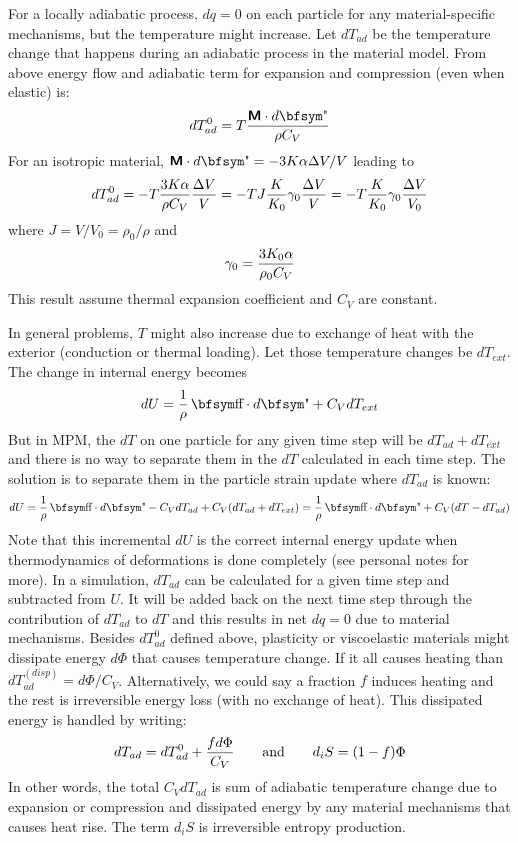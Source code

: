 \documentclass[11pt]{book}
\newcommand{\tens}[1]{\boldsymbol{\mathsf{#1}}}
\def\st{{\hbox{\bfsym\char'033}}}
\def\et{{\hbox{\bfsym\char'042}}}
\begin{document}
For a locally adiabatic process, $dq=0$ on each particle for any material-specific mechanisms, but the temperature might increase. Let $dT_{ad}$ be the temperature change that happens during an adiabatic process in the material model. From above energy flow and adiabatic term for expansion and compression (even when elastic) is:
\begin{equation}
    dT_{ad}^0 = T {\tens{M}\cdot d\et\over \rho C_V}
\end{equation}
For an isotropic material, $\tens{M}\cdot d\et = - 3K\alpha \Delta V/V$ leading to
\begin{equation}
    dT_{ad}^0 = -T {3K\alpha\over \rho C_V}{\Delta V\over V} = -T J {K\over K_0} \gamma_0 {\Delta V\over V} = -T {K\over K_0} \gamma_0 {\Delta V\over V_0}
\end{equation}
where $J = V/V_0 = \rho_0/ \rho$ and
\begin{equation}
    \gamma_0 = {3K_0\alpha\over \rho_0 C_V}      \label{gamzdef}
\end{equation}
This result assume thermal expansion coefficient and $C_V$ are constant.

In general problems, $T$ might also increase due to exchange of heat with the exterior (conduction or thermal loading). Let those temperature changes be $dT_{ext}$. The change in internal energy becomes
\begin{equation}
    dU = {1\over \rho}\thinspace \st\cdot d\et + C_V dT_{ext}
\end{equation}
But in MPM, the $dT$ on one particle for any given time step will be $dT_{ad}+dT_{ext}$ and there is no way to separate them in the $dT$ calculated in each time step. The solution is to separate them in the particle strain update where $dT_{ad}$ is known:
\begin{equation}
    dU = {1\over \rho}\thinspace \st\cdot d\et - C_V dT_{ad} + C_V (dT_{ad}+dT_{ext}) = {1\over \rho}\thinspace \st\cdot d\et + C_V(dT-dT_{ad})
\end{equation}
Note that this incremental $dU$ is the correct internal energy update when thermodynamics of deformations is done completely (see personal notes for more).
In a simulation, $dT_{ad}$ can be calculated for a given time step and subtracted from $U$. It will be added back on the next time step through the contribution of $dT_{ad}$ to $dT$ and this results in net $dq=0$ due to material mechanisms. Besides $dT_{ad}^0$ defined above, plasticity or viscoelastic materials might dissipate energy $d\Phi$ that causes temperature change. If it all causes heating than $dT_{ad}^{(disp)} = d\Phi/C_V$. Alternatively, we could say a fraction $f$ induces heating and the rest is irreversible energy loss (with no exchange of heat). This dissipated energy is handled by writing:
\begin{equation}
    dT_{ad} = dT_{ad}^0 + {fd\Phi\over C_V}   \qquad {\rm and} \qquad d_iS = (1-f)\Phi
\end{equation}
In other words, the total $C_V dT_{ad}$ is sum of adiabatic temperature change due to expansion or compression and dissipated energy by any material mechanisms that causes heat rise. The term $d_iS$ is irreversible entropy production.
\end{document}
